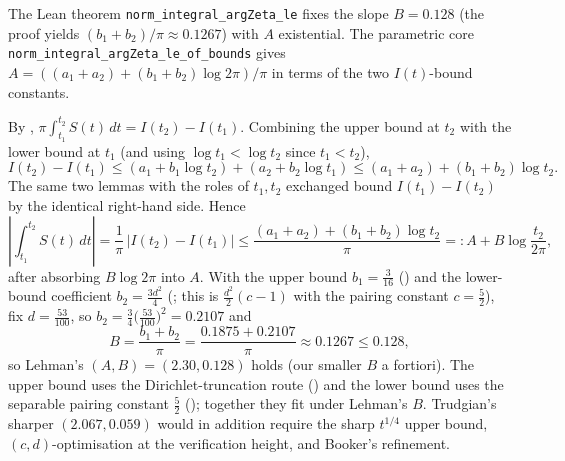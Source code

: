 \noindent
The Lean theorem \texttt{norm\_integral\_argZeta\_le} fixes the slope $B=0.128$ (the
proof yields $(b_1+b_2)/\pi\approx0.1267$) with $A$ existential. The parametric core
\texttt{norm\_integral\_argZeta\_le\_of\_bounds} gives
$A=((a_1+a_2)+(b_1+b_2)\log2\pi)/\pi$ in terms of the two $I(t)$-bound constants.

By , $\pi\int_{t_1}^{t_2}S(t)\,dt = I(t_2)-I(t_1)$.
Combining the upper bound  at $t_2$ with the lower bound
 at $t_1$ (and using $\log t_1<\log t_2$ since
$t_1<t_2$),
\[
  I(t_2)-I(t_1)
  \le (a_1+b_1\log t_2) + (a_2+b_2\log t_1)
  \le (a_1+a_2) + (b_1+b_2)\log t_2 .
\]
The same two lemmas with the roles of $t_1,t_2$ exchanged bound
$I(t_1)-I(t_2)$ by the identical right-hand side. Hence
\[
  \left|\int_{t_1}^{t_2}S(t)\,dt\right|
  = \frac1\pi\,\bigl|I(t_2)-I(t_1)\bigr|
  \le \frac{(a_1+a_2)+(b_1+b_2)\log t_2}{\pi}
  =: A + B\log\frac{t_2}{2\pi} ,
\]
after absorbing $B\log 2\pi$ into $A$. With the upper bound
$b_1=\tfrac3{16}$ () and the lower-bound coefficient
$b_2=\tfrac{3d^2}4$ (; this is $\tfrac{d^2}2(c-1)$ with the
pairing constant $c=\tfrac52$), fix $d=\tfrac{53}{100}$, so
$b_2=\tfrac34\bigl(\tfrac{53}{100}\bigr)^2=0.2107$ and
\[
  B=\frac{b_1+b_2}\pi=\frac{0.1875+0.2107}{\pi}\approx0.1267\le0.128 ,
\]
so Lehman's $(A,B)=(2.30,0.128)$ \cite{Lehman1970} holds (our smaller $B$ a
fortiori). The upper bound uses the Dirichlet-truncation route
() and the lower bound uses the separable pairing constant
$\tfrac52$ (); together they fit under Lehman's $B$.
Trudgian's sharper $(2.067,0.059)$ \cite{TrudgianTuring} would in addition require
the sharp $t^{1/4}$ upper bound, $(c,d)$-optimisation at the verification height,
and Booker's refinement.
